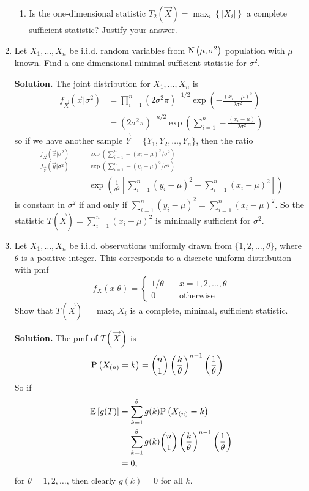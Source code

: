 \documentclass[titlepage]{article}
\begin{document}
\begin{enumerate}
\begin{enumerate}
\item Is the one-dimensional statistic $T_2(\vec{X}) = \max_i \left\{|X_i|\right\}$ a complete sufficient statistic? Justify your answer.
\end{enumerate}

\item Let $X_1, \ldots, X_n$ be i.i.d. random variables from $\N{\mu, \sigma^2}$ population with $\mu$ known. Find a one-dimensional minimal sufficient statistic for $\sigma^2$.

\textbf{Solution.} The joint distribution for $X_1, \ldots, X_n$ is
\[\begin{aligned}
f_\vec{X}(\vec{x} | \sigma^2) &= \prod_{i=1}^n (2\sigma^2\pi)^{-1/2}\exp\left(-\frac{(x_i - \mu)^2}{2\sigma^2}\right) \\
&= \left(2\sigma^2\pi\right)^{-n/2} \exp \left(\sum_{i=1}^n -\frac{(x_i - \mu)}{2\sigma^2}\right)
\end{aligned}\]
so if we have another sample $\vec{Y} = \{Y_1, Y_2, \ldots, Y_n\}$, then the ratio
\[\begin{aligned}
\frac{f_\vec{X}(\vec{x} | \sigma^2)}{f_\vec{Y}(\vec{y} | \sigma^2)} &= \frac{\exp\left(\sum_{i=1}^n-(x_i-\mu)^2/\sigma^2\right)}{\exp\left(\sum_{i=1}^n-(y_i-\mu)^2/\sigma^2\right)} \\
&= \exp\left(\frac{1}{\sigma^2}\left[\sum_{i=1}^n(y_i - \mu)^2 - \sum_{i=1}^n (x_i - \mu)^2\right]\right)
\end{aligned}\]
is constant in $\sigma^2$ if and only if $\sum_{i=1}^n(y_i - \mu)^2 = \sum_{i=1}^n(x_i - \mu)^2$. So the statistic $T(\vec{X}) = \sum_{i=1}^n(x_i - \mu)^2$ is minimally sufficient for $\sigma^2$.

\item Let $X_1, \ldots, X_n$ be i.i.d. observations uniformly drawn from $\{1, 2, \ldots, \theta\}$, where $\theta$ is a positive integer. This corresponds to a discrete uniform distribution with pmf
\[f_X(x|\theta) = \begin{cases}
1/\theta &\quad x = 1, 2, \ldots, \theta \\
0 &\quad \text{otherwise}
\end{cases}\]
Show that $T(\vec{X}) = \max_i X_i$ is a complete, minimal, sufficient statistic.

\textbf{Solution.} The pmf of $T(\vec{X})$ is
\[\begin{aligned}
\P{X_{(n)} = k} &= \binom{n}{1} \left(\frac{k}{\theta}\right)^{n-1}\left(\frac{1}{\theta}\right)
\end{aligned}\]
So if
\[
\begin{aligned}
  \ev{g(T)} &= \sum_{k=1}^\theta g(k) \P{X_{(n)} = k} \\
            &= \sum_{k=1}^\theta g(k) \binom{n}{1} \left(\frac{k}{\theta}\right)^{n-1}\left(\frac{1}{\theta}\right) \\
            &= 0,
\end{aligned}\]
for $\theta = 1, 2, \ldots$, then clearly $g(k) = 0$ for all $k$.

\end{enumerate}
\end{document}
